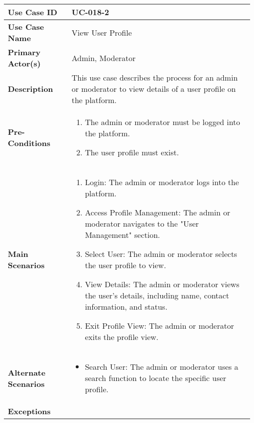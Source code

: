 \begin{table}[!ht]
    \centering
    \renewcommand{\arraystretch}{1.3} %
    \begin{tabularx}{\textwidth}{|l|X|}
        \hline
        \textbf{Use Case ID} & UC-018-2 \\
        \hline
        \textbf{Use Case Name} & View User Profile \\
        \hline
        \textbf{Primary Actor(s)} & Admin, Moderator \\
        \hline
        \textbf{Description} & This use case describes the process for an admin or moderator to view details of a user profile on the platform. \\
        \hline
        \textbf{Pre-Conditions} & 
        \begin{enumerate}[label=\arabic*.,itemsep=0pt]
            \item The admin or moderator must be logged into the platform.
            \item The user profile must exist.
        \end{enumerate} \\
        \hline
        \textbf{Main Scenarios} & 
        \begin{enumerate}[label=\arabic*.,itemsep=0pt]
            \item Login: The admin or moderator logs into the platform.
            \item Access Profile Management: The admin or moderator navigates to the "User Management" section.
            \item Select User: The admin or moderator selects the user profile to view.
            \item View Details: The admin or moderator views the user's details, including name, contact information, and status.
            \item Exit Profile View: The admin or moderator exits the profile view.
        \end{enumerate} \\
        \hline
        \textbf{Alternate Scenarios} & 
        \begin{itemize}[label=--,itemsep=0pt]
            \item Search User: The admin or moderator uses a search function to locate the specific user profile.
        \end{itemize} \\
        \hline
        \textbf{Exceptions} & 
        \begin{itemize}[label=--,itemsep=0pt]

\end{itemize}
\end{tabularx}
\end{table}
